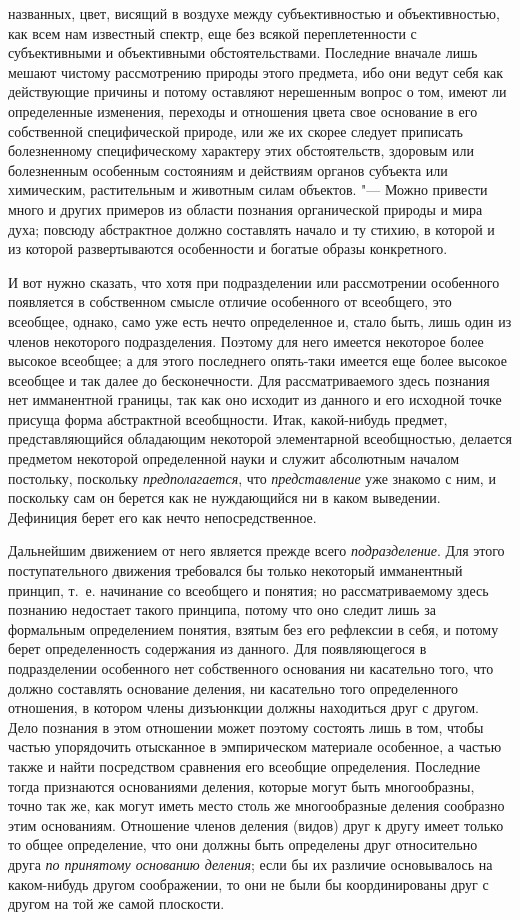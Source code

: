 {{названных, цвет, висящий в воздухе между субъективностью и объективностью,
как всем нам известный спектр, еще без всякой переплетенности с
субъективными и объективными обстоятельствами. Последние вначале лишь
мешают чистому рассмотрению природы этого предмета, ибо они ведут себя как
действующие причины и потому оставляют нерешенным вопрос о том, имеют ли
определенные изменения, переходы и отношения цвета свое основание в его
собственной специфической природе, или же их скорее следует приписать
болезненному специфическому характеру этих обстоятельств, здоровым или
болезненным особенным состояниям и действиям органов субъекта или
химическим, растительным и животным силам объектов. "--- Можно
привести много и других примеров из области познания органической природы и
мира духа; повсюду абстрактное должно составлять начало и ту стихию, в
которой и из которой развертываются особенности и богатые образы
конкретного.

И вот нужно сказать, что хотя при подразделении или
рассмотрении особенного появляется в собственном смысле отличие особенного
от всеобщего, это всеобщее, однако, само уже есть нечто определенное и,
стало быть, лишь один из членов некоторого подразделения. Поэтому для него
имеется некоторое более высокое всеобщее; а для этого последнего опять-таки
имеется еще более высокое всеобщее и так далее до
бесконечности. Для рассматриваемого здесь познания нет имманентной границы,
так как оно исходит из данного и его исходной точке присуща форма
абстрактной всеобщности. Итак, какой-нибудь предмет, представляющийся
обладающим некоторой элементарной всеобщностью, делается предметом
некоторой определенной науки и служит абсолютным началом постольку,
поскольку {\em предполагается},
что {\em представление}
уже знакомо с ним, и поскольку сам он берется как не
нуждающийся ни в каком выведении. Дефиниция берет его как нечто
непосредственное.

Дальнейшим движением от него является прежде всего
{\em подразделение}. Для
этого поступательного движения требовался бы только некоторый имманентный
принцип, т.~е. начинание со всеобщего и понятия; но рассматриваемому здесь
познанию недостает такого принципа, потому что оно следит лишь за
формальным определением понятия, взятым без его рефлексии в себя, и потому
берет определенность содержания из данного. Для появляющегося в
подразделении особенного нет собственного основания ни касательно того, что
должно составлять основание деления, ни касательно того определенного
отношения, в котором члены дизъюнкции должны находиться друг с другом. Дело
познания в этом отношении может поэтому состоять лишь в том, чтобы частью
упорядочить отысканное в эмпирическом материале особенное, а частью также и
найти посредством сравнения его всеобщие определения. Последние тогда
признаются основаниями деления, которые могут быть многообразны, точно так
же, как могут иметь место столь же многообразные деления сообразно этим
основаниям. Отношение членов деления (видов) друг к другу имеет только то
общее определение, что они должны быть определены друг относительно друга
{\em по принятому основанию деления};
если бы их различие основывалось на каком-нибудь другом
соображении, то они не были бы координированы друг с другом на той же самой
плоскости.

}}
